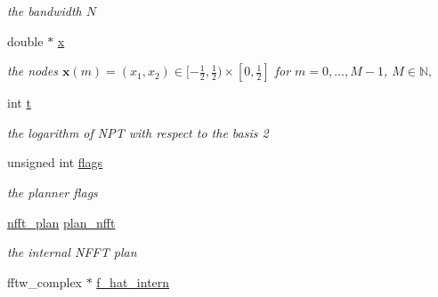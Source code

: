 \begin{DoxyCompactItemize}
\begin{DoxyCompactList}\small\item\em the bandwidth $N$ \end{DoxyCompactList}\item 
\hypertarget{structnfsft__plan_af361cee5b4f7dabae68e53674861df90}{double $\ast$ \hyperlink{structnfsft__plan_af361cee5b4f7dabae68e53674861df90}{x}}\label{structnfsft__plan_af361cee5b4f7dabae68e53674861df90}

\begin{DoxyCompactList}\small\item\em the nodes $\mathbf{x}(m) = \left(x_1,x_2\right) \in [-\frac{1}{2},\frac{1}{2}) \times [0,\frac{1}{2}]$ for $m=0,\ldots, M-1$, $M \in \mathbb{N},$ \end{DoxyCompactList}\item 
\hypertarget{structnfsft__plan_a59d80818cb9c0dcaccc477954720772c}{int \hyperlink{structnfsft__plan_a59d80818cb9c0dcaccc477954720772c}{t}}\label{structnfsft__plan_a59d80818cb9c0dcaccc477954720772c}

\begin{DoxyCompactList}\small\item\em the logarithm of N\-P\-T with respect to the basis 2 \end{DoxyCompactList}\item 
\hypertarget{structnfsft__plan_a5ad6e9d30dd23d5be94b9277e5068694}{unsigned int \hyperlink{structnfsft__plan_a5ad6e9d30dd23d5be94b9277e5068694}{flags}}\label{structnfsft__plan_a5ad6e9d30dd23d5be94b9277e5068694}

\begin{DoxyCompactList}\small\item\em the planner flags \end{DoxyCompactList}\item 
\hypertarget{structnfsft__plan_af21a62a31af4918fda1376612398369e}{\hyperlink{structnfft__plan}{nfft\-\_\-plan} \hyperlink{structnfsft__plan_af21a62a31af4918fda1376612398369e}{plan\-\_\-nfft}}\label{structnfsft__plan_af21a62a31af4918fda1376612398369e}

\begin{DoxyCompactList}\small\item\em the internal N\-F\-F\-T plan \end{DoxyCompactList}\item 
\hypertarget{structnfsft__plan_a79156943fb3c87599ee7fa3bc157f548}{fftw\-\_\-complex $\ast$ \hyperlink{structnfsft__plan_a79156943fb3c87599ee7fa3bc157f548}{f\-\_\-hat\-\_\-intern}}\label{structnfsft__plan_a79156943fb3c87599ee7fa3bc157f548}


\end{DoxyCompactItemize}
